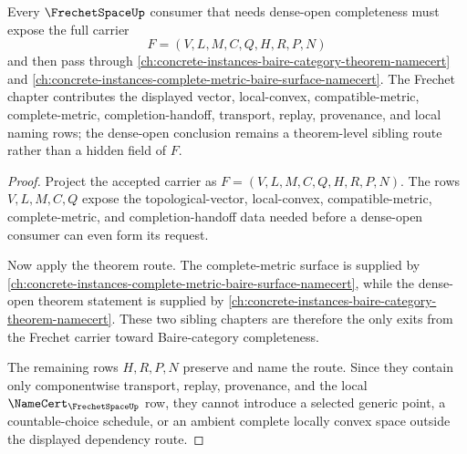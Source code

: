 \begin{theorem}
\label{thm:frechet-space-baire-category-completeness-route}
Every $\FrechetSpaceUp$ consumer that needs dense-open completeness must expose the full carrier
$$
F=(V,L,M,C,Q,H,R,P,N)
$$
and then pass through \autoref{ch:concrete-instances-baire-category-theorem-namecert} and \autoref{ch:concrete-instances-complete-metric-baire-surface-namecert}. The Frechet chapter contributes the displayed vector, local-convex, compatible-metric, complete-metric, completion-handoff, transport, replay, provenance, and local naming rows; the dense-open conclusion remains a theorem-level sibling route rather than a hidden field of $F$.
\end{theorem}
\begin{proof}
Project the accepted carrier as $F=(V,L,M,C,Q,H,R,P,N)$. The rows $V,L,M,C,Q$ expose the topological-vector, local-convex, compatible-metric, complete-metric, and completion-handoff data needed before a dense-open consumer can even form its request.

Now apply the theorem route. The complete-metric surface is supplied by \autoref{ch:concrete-instances-complete-metric-baire-surface-namecert}, while the dense-open theorem statement is supplied by \autoref{ch:concrete-instances-baire-category-theorem-namecert}. These two sibling chapters are therefore the only exits from the Frechet carrier toward Baire-category completeness.

The remaining rows $H,R,P,N$ preserve and name the route. Since they contain only componentwise transport, replay, provenance, and the local $\NameCert_{\FrechetSpaceUp}$ row, they cannot introduce a selected generic point, a countable-choice schedule, or an ambient complete locally convex space outside the displayed dependency route.
\end{proof}
